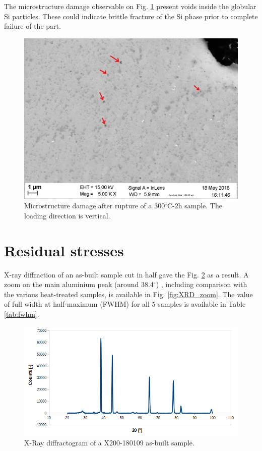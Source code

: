 The microstructure damage observable on Fig. \ref{fig:dmg_04_05} present voids inside the globular Si particles. These could indicate brittle fracture of the Si phase prior to complete failure of the part.\\

\begin{figure}[ht]
	\centering
	\centerline{\includegraphics[scale=0.40]{Images/dmg-04_05.jpg}}
	\decoRule
	\caption[Microstructure damage after rupture of a 300$^\circ$C-2h sample. The loading direction is vertical]{Microstructure damage after rupture of a 300$^\circ$C-2h sample. The loading direction is vertical.}
	\label{fig:dmg_04_05}
\end{figure}

\section{Residual stresses}

X-ray diffraction of an as-built sample cut in half gave the Fig. \ref{fig:XRD} as a result. A zoom on the main aluminium peak (around 38.4$^\circ$) \cite{Rosenthal14}, including comparison with the various heat-treated samples, is available in Fig. \ref{fig:XRD_zoom}. The value of full width at half-maximum (FWHM) for all 5 samples is available in Table \ref{tab:fwhm}.

\begin{figure}[ht]
	\centering
	\centerline{\includegraphics[scale=0.60]{Images/XRD}}
	\decoRule
	\caption[X-Ray diffractogram of a X200-180109 as-built sample]{X-Ray diffractogram of a X200-180109 as-built sample.}
	\label{fig:XRD}
\end{figure}

